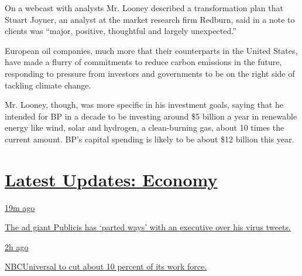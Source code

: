 On a webcast with analysts Mr. Looney described a transformation plan
that Stuart Joyner, an analyst at the market research firm Redburn, said
in a note to clients was ``major, positive, thoughtful and largely
unexpected.''

European oil companies, much more that their counterparts in the United
States, have made a flurry of commitments to reduce carbon emissions in
the future, responding to pressure from investors and governments to be
on the right side of tackling climate change.

Mr. Looney, though, was more specific in his investment goals, saying
that he intended for BP in a decade to be investing around \$5 billion a
year in renewable energy like wind, solar and hydrogen, a clean-burning
gas, about 10 times the current amount. BP's capital spending is likely
to be about \$12 billion this year.

\hypertarget{latest-updates-economy}{%
\section{\texorpdfstring{\href{https://www.nytimes.com/live/2020/08/04/business/stock-market-today-coronavirus?action=click\&pgtype=Article\&state=default\&region=MAIN_CONTENT_1\&context=storylines_live_updates}{Latest
Updates:
Economy}}{Latest Updates: Economy}}\label{latest-updates-economy}}

\href{https://www.nytimes.com/live/2020/08/04/business/stock-market-today-coronavirus?action=click\&pgtype=Article\&state=default\&region=MAIN_CONTENT_1\&context=storylines_live_updates\#the-ad-giant-publicis-has-parted-ways-with-an-executive-over-his-virus-tweets}{19m
ago}

\href{https://www.nytimes.com/live/2020/08/04/business/stock-market-today-coronavirus?action=click\&pgtype=Article\&state=default\&region=MAIN_CONTENT_1\&context=storylines_live_updates\#the-ad-giant-publicis-has-parted-ways-with-an-executive-over-his-virus-tweets}{The
ad giant Publicis has `parted ways' with an executive over his virus
tweets.}

\href{https://www.nytimes.com/live/2020/08/04/business/stock-market-today-coronavirus?action=click\&pgtype=Article\&state=default\&region=MAIN_CONTENT_1\&context=storylines_live_updates\#nbcuniversal-to-cut-about-10-percent-of-its-work-force}{2h
ago}

\href{https://www.nytimes.com/live/2020/08/04/business/stock-market-today-coronavirus?action=click\&pgtype=Article\&state=default\&region=MAIN_CONTENT_1\&context=storylines_live_updates\#nbcuniversal-to-cut-about-10-percent-of-its-work-force}{NBCUniversal
to cut about 10 percent of its work force.}

